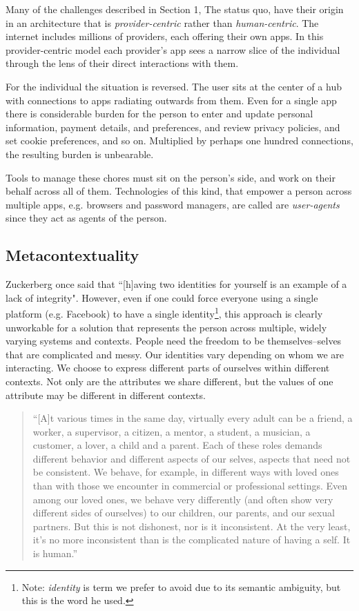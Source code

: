 \documentclass[11pt, oneside]{article}   	%
\begin{document}
Many of the challenges described in Section 1, The status quo, have their origin in an architecture that is \emph{provider-centric} rather than \emph{human-centric}. The internet includes millions of providers, each offering their own apps. In this provider-centric model each provider's app sees a narrow slice of the individual through the lens of their direct interactions with them. 

For the individual the situation is reversed. The user sits at the center of a hub with connections to apps radiating outwards from them. Even for a single app there is considerable burden for the person to enter and update personal information, payment details, and preferences, and review privacy policies, and set cookie preferences, and so on. Multiplied by perhaps one hundred connections, the resulting burden is unbearable. 

Tools to manage these chores must sit on the person's side, and work on their behalf across all of them. Technologies of this kind, that empower a person across multiple apps, e.g. browsers and password managers, are called are \emph{user-agents} since they act as agents of the person. 

\subsection{Metacontextuality}

Zuckerberg once said that ``[h]aving two identities for yourself is an example of a lack of integrity"\cite{Kirkpatrick2011}. However, even if one could force everyone using a single platform (e.g. Facebook) to have a single identity\footnote{Note: \emph{identity} is term we prefer to avoid due to its semantic ambiguity, but this is the word he used.}, this approach is clearly unworkable for a solution that represents the person across multiple, widely varying systems and contexts. People need the freedom to be themselves--selves that are complicated and messy. Our identities vary depending on whom we are interacting. We choose to express different parts of ourselves within different contexts. Not only are the attributes we share different, but the values of one attribute may be different in different contexts. 

\begin{quote} 
	``[A]t various times in the same day, virtually every adult can be a friend, a worker, a supervisor, a citizen, a mentor, a student, a musician, a customer, a lover, a child and a parent. Each of these roles demands different behavior and different aspects of our selves, aspects that need not be consistent. We behave, for example, in different ways with loved ones than with those we encounter in commercial or professional settings. Even among our loved ones, we behave very differently (and often show very different sides of ourselves) to our children, our parents, and our sexual partners. But this is not dishonest, nor is it inconsistent. At the very least, it's no more inconsistent than is the complicated nature of having a self. It is human.''\cite[p122]{Richards2021}
\end{quote}
\end{document}
